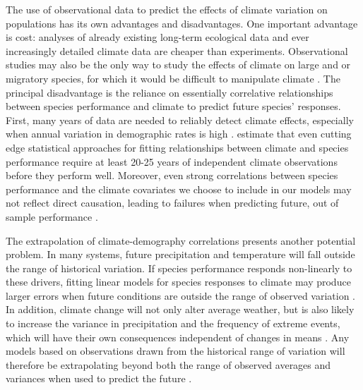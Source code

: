 \documentclass[11pt]{article}
\begin{document}
\begin{doublespace}
The use of observational data to predict the effects of climate variation on populations has its own advantages and disadvantages. One important advantage is cost: analyses of already existing long-term ecological data and ever increasingly detailed climate data are cheaper than experiments. Observational studies may also be the only way to study the effects of climate on large and or migratory species, for which it would be difficult to manipulate climate \citep{koons_climate_2012,jenouvrier_demographic_2009,aubry_climate_2013}. The principal disadvantage is the reliance on essentially correlative relationships between species performance and climate to predict future species' responses. First, many years of data are needed to reliably detect climate effects, especially when annual variation in demographic rates is high \citep{teller_linking_2016,gerber_optimal_2015}. \citep{teller_linking_2016} estimate that even cutting edge statistical approaches for fitting relationships between climate and species performance require at least 20-25 years of independent climate observations before they perform well. Moreover, even strong correlations between species performance and the climate covariates we choose to include in our models may not reflect direct causation, leading to failures when predicting future, out of sample performance \citep{hilborn_correlation_2016}. 

The extrapolation of climate-demography correlations presents another potential problem. In many systems, future precipitation and temperature will fall outside the range of historical variation. If species performance responds non-linearly to these drivers, fitting linear models for species responses to climate may produce larger errors when future conditions are outside the range of observed variation \citep{doak_demographic_2010}. In addition, climate change will not only alter average weather, but is also likely to increase the variance in precipitation and the frequency of extreme events, which will have their own consequences independent of changes in means \citep{gherardi_enhanced_2015,jentsch_new_2007}. Any models based on observations drawn from the historical range of variation will therefore be extrapolating beyond both the range of observed averages and variances when used to predict the future \citep{williams_novel_2007}. 


\end{doublespace}
\end{document}
